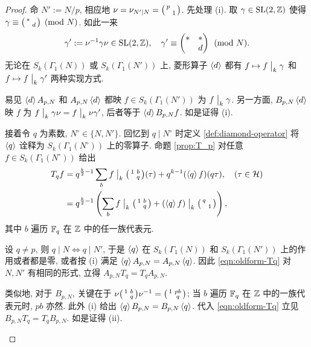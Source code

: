 \begin{proof}
	命 $N' := N/p$, 相应地 $\nu = \nu_{N' \mid N} = \bigl(\begin{smallmatrix} p &  \\  & 1 \end{smallmatrix}\bigr)$. 先处理 (i). 取 $\gamma \in \operatorname{SL}(2,\mathbb{Z})$ 使得 $\gamma \equiv \bigl(\begin{smallmatrix} * &  \\  & d \end{smallmatrix}\bigr) \pmod{N}$. 如此一来
	\[ \gamma' := \nu^{-1}\gamma \nu \in \operatorname{SL}(2,\mathbb{Z}), \quad \gamma' \equiv \begin{pmatrix} * & * \\  & d \end{pmatrix} \pmod{N}. \]
	无论在 $S_k(\Gamma_1(N))$ 或 $S_k(\Gamma_1(N'))$ 上, 菱形算子 $\left\langle d \right\rangle$ 都有 $f \mapsto f \;\big|_{k} \; \gamma$ 和 $f \mapsto f \;\big|_{k} \; \gamma'$ 两种实现方式.
	
	易见 $\left\langle d \right\rangle A_{p,N}$ 和 $A_{p,N} \left\langle d \right\rangle$ 都映 $f \in S_k(\Gamma_1(N'))$ 为 $f \;\big|_{k} \; \gamma$. 另一方面, $B_{p,N} \left\langle d \right\rangle$ 映 $f$ 为 $f \;\big|_{k} \; \gamma\nu = f \;\big|_{k} \; \nu \gamma'$, 后者等于 $\left\langle d \right\rangle B_{p,N} f$. 如是证得 (i).
	
	接着令 $q$ 为素数, $N^\circ \in \{N, N'\}$. 回忆到 $q \mid N^\circ$ 时定义 \ref{def:diamond-operator} 将 $\left\langle q \right\rangle$ 诠释为 $S_k(\Gamma_1(N^\circ))$ 上的零算子. 命题 \ref{prop:T_p} 对任意 $f \in S_k(\Gamma_1(N^\circ))$ 给出
	\begin{equation}\label{eqn:oldform-Tq}\begin{aligned}
		T_q f & = q^{\frac{k}{2} - 1} \displaystyle\sum_b f \;\big|_{k} \; \bigl(\begin{smallmatrix} 1 & b \\  & q \end{smallmatrix}\bigr) (\tau) + q^{k-1} (\left\langle q \right\rangle f)(q\tau), \quad (\tau \in \mathcal{H}) \\
		& = q^{\frac{k}{2} - 1} \left( \sum_b f \;\big|_{k} \; \bigl(\begin{smallmatrix} 1 & b \\  & q \end{smallmatrix}\bigr) + (\left\langle q \right\rangle f) \;\big|_{k} \; \bigl(\begin{smallmatrix} q &  \\  & 1 \end{smallmatrix}\bigr) \right),
	\end{aligned}\end{equation}
	其中 $b$ 遍历 $\mathbb{F}_q$ 在 $\mathbb{Z}$ 中的任一族代表元.
	\begin{asparaenum}[(a)]
		\item 设 $q \neq p$, 则 $q \mid N \iff q \mid N'$, 于是 $\left\langle q \right\rangle$ 在 $S_k(\Gamma_1(N))$ 和 $S_k(\Gamma_1(N'))$ 上的作用或者都是零, 或者按 (i) 满足 $\left\langle q \right\rangle A_{p,N} = A_{p,N} \left\langle q \right\rangle$. 因此 \eqref{eqn:oldform-Tq} 对 $N, N'$ 有相同的形式, 立得 $A_{p,N} T_q = T_q A_{p,N}$.
		
		类似地, 对于 $B_{p,N}$, 关键在于 $\nu \bigl(\begin{smallmatrix} 1 & b \\  & q \end{smallmatrix}\bigr) \nu^{-1} = \bigl(\begin{smallmatrix} 1 & pb \\  & q \end{smallmatrix}\bigr)$; 当 $b$ 遍历 $\mathbb{F}_q$ 在 $\mathbb{Z}$ 中的一族代表元时, $pb$ 亦然. 此外 (i) 给出 $\left\langle q \right\rangle B_{p,N} = B_{p,N} \left\langle q \right\rangle$. 代入 \eqref{eqn:oldform-Tq} 立见 $B_{p,N} T_q = T_q B_{p,N}$. 如是证得 (ii).


\end{asparaenum}
\end{proof}
